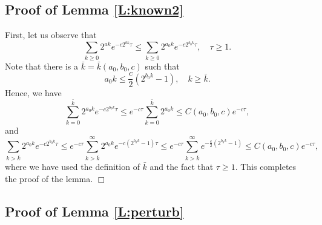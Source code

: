\subsection{Proof of Lemma \ref{L:known2}}
\label{LemmaK2}
First, let us observe that  
\begin{equation}
 \sum_{k\ge 0}  2^{a k}e^{-c2^{b k}\tau} \le \sum_{k\ge 0}  2^{a_0 k}e^{-c2^{b_0 k}\tau}, \quad \tau\ge 1.
\end{equation}
Note that  there is a $
\bar k=\bar k(a_0,b_0,c)$ such that
\begin{equation}
 a_0k\le \frac{c}{2}(2^{b_0 k}-1), \quad k\ge \bar k.
\end{equation}
Hence, we have
\begin{equation}
\sum_{k=0}^{\bar k}  2^{a_0 k}e^{-c2^{b_0 k}\tau}\leq 
e^{-c\tau}\sum_{k=0}^{\bar k}  2^{a_0 k}\le  C(a_0,b_0,c)e^{-c\tau},
\end{equation}
and 
\begin{equation}
\sum_{k>\bar k}  2^{a_0 k}e^{-c2^{b_0 k}\tau}\le
e^{-c\tau}\sum_{k>\bar k}^\infty  2^{a_0 k}e^{-c(2^{b_0 k}-1)\tau} \le e^{-c\tau}
\sum_{k>\bar k}^\infty  e^{-\frac{c}{2}(2^{b_0 k}-1)} 
\le  C(a_0,b_0,c)e^{-c\tau},
\end{equation}
 where we have used the definition of $\bar k$ and the fact that $\tau\ge 1$.  This completes the proof of the lemma.
\hfill $\Box$




\subsection{Proof of Lemma \ref{L:perturb}}
\label{SS:A2}


